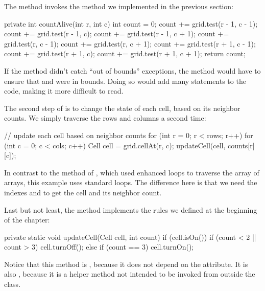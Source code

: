 The  method  invokes the  method we implemented in the previous section:

\begin{code}
private int countAlive(int r, int c) {
    int count = 0;
    count += grid.test(r - 1, c - 1);
    count += grid.test(r - 1, c);
    count += grid.test(r - 1, c + 1);
    count += grid.test(r, c - 1);
    count += grid.test(r, c + 1);
    count += grid.test(r + 1, c - 1);
    count += grid.test(r + 1, c);
    count += grid.test(r + 1, c + 1);
    return count;
}
\end{code}

If the  method didn't catch ``out of bounds'' exceptions, the  method would have to ensure that  and  were in bounds.
Doing so would add many  statements to the code, making it more difficult to read.

The second step of  is to change the state of each cell, based on its neighbor counts.
We simply traverse the rows and columns a second time:

\begin{code}
// update each cell based on neighbor counts
for (int r = 0; r < rows; r++) {
    for (int c = 0; c < cols; c++) {
        Cell cell = grid.cellAt(r, c);
        updateCell(cell, counts[r][c]);
    }
}
\end{code}

In contrast to the  method of , which used enhanced  loops to traverse the array of arrays, this example uses standard  loops.
The difference here is that we need the indexes  and  to get the cell and its neighbor count.

Last but not least, the  method implements the rules we defined at the beginning of the chapter:

\begin{code}
private static void updateCell(Cell cell, int count) {
    if (cell.isOn()) {
        if (count < 2 || count > 3) {
            cell.turnOff();
        }
    } else {
        if (count == 3) {
            cell.turnOn();
        }
    }
}
\end{code}

Notice that this method is , because it does not depend on the  attribute.
It is also , because it is a helper method not intended to be invoked from outside the class.

